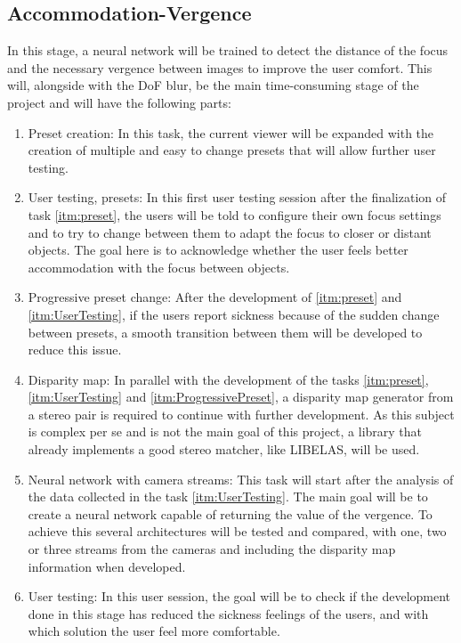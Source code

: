 \documentclass[10pt,a4paper,twocolumn,twoside]{article}
\begin{document}
	\subsection{Accommodation-Vergence}
	\label{subsec:vergence}
	In this stage, a neural network will be trained to detect the distance of the focus and the necessary vergence between images to improve the user comfort.
	This will, alongside with the DoF blur, be the main time-consuming stage of the project and will have the following parts:
	\begin{enumerate}
		\item \label{itm:preset}  Preset creation: In this task, the current viewer will be expanded with the creation of multiple and easy to change presets that will allow further user testing.
		
		\item \label{itm:UserTesting} User testing, presets: In this first user testing session after the finalization of task \ref{itm:preset}, the users will be told to configure their own focus settings and to try to change between them to adapt the focus to closer or distant objects. The goal here is to acknowledge whether the user feels better accommodation with the focus between objects.
		
		\item \label{itm:ProgressivePreset} Progressive preset change: After the development of \ref{itm:preset} and \ref{itm:UserTesting}, if the users report sickness because of the sudden change between presets, a smooth transition between them will be developed to reduce this issue. 
		
		\item Disparity map: In parallel with the development of the tasks \ref{itm:preset}, \ref{itm:UserTesting} and \ref{itm:ProgressivePreset}, a disparity map generator from a stereo pair is required to continue with further development. As this subject is complex per se and is not the main goal of this project, a library that already implements a good stereo matcher, like LIBELAS\cite{web:LIBELAS}, will be used. 
		
		\item Neural network with camera streams: This task will start after the analysis of the data collected in the task \ref{itm:UserTesting}. The main goal will be to create a neural network capable of returning the value of the vergence. To achieve this several architectures will be tested and compared, with one, two or three streams from the cameras and including the disparity map information when developed.
		
		\item User testing: In this user session, the goal will be to check if the development done in this stage has reduced the sickness feelings of the users, and with which solution the user feel more comfortable.
	\end{enumerate}
	
\end{document}

